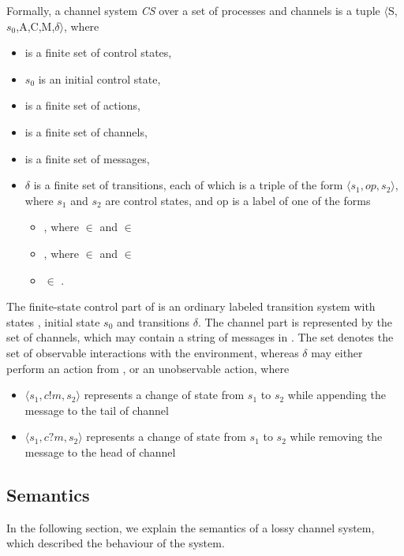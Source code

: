 \label{CS}
Formally, a channel system \emph{CS} over a set of processes  and channels  is a tuple $\langle$S,$s_0$,A,C,M,$\delta$$\rangle$, where 
\begin{itemize}
\item[]
 is a finite set of control states,
\item[]
$s_0$ is an initial control state,
\item[]
 is a finite set of actions,
\item[]
 is a finite set of channels,
\item[]
 is a finite set of messages,
\item[]
$\delta$ is a finite set of transitions, each of which is a triple of the form $\langle s_1,op,s_2\rangle$, where $s_1$ and $s_2$ are control states, and op is a label of one of the forms

\begin{itemize}
\item
{}, where  $\in$  and  $\in$ 
\item
{}, where  $\in$  and  $\in$ 
\item
{} $\in$ .
\end{itemize}
\end{itemize}

The finite-state control part of  is an ordinary labeled transition system with states , initial state $s_0$ and transitions $\delta$. The channel part is represented by the set  of channels, which may contain a string of messages in . The set  denotes the set of observable interactions with the environment, whereas $\delta$ may either perform an action from , or an unobservable action, where

\begin{itemize}
\item[]
$\langle s_1, c!m, s_2\rangle$ represents a change of state from $s_1$ to $s_2$ while appending the message  to the tail of channel 
\item[]
$\langle s_1, c?m, s_2\rangle$ represents a change of state from $s_1$ to $s_2$ while removing the message  to the head of channel 
\end{itemize}

\subsection{Semantics}
In the following section, we explain the semantics of a lossy channel system, which described the behaviour of the system.

